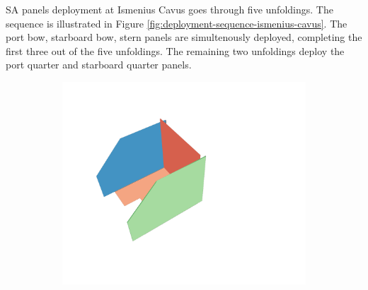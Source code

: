 \vspace{0.5cm}

\ac{SA} panels deployment at Ismenius Cavus goes through five unfoldings. The sequence is illustrated in Figure \ref{fig:deployment-sequence-ismenius-cavus}. The port bow, starboard bow, stern panels are simultenously deployed, completing the first three out of the five unfoldings. The remaining two unfoldings deploy the port quarter and starboard quarter panels.

\vspace{0.5cm}

\begin{figure}[h]
\captionsetup[subfigure]{justification=centering}
\vspace{-2ex}
	\centering
    \setlength{\subfigureWidth}{0.32\textwidth}
    \setlength{\graphicsHeight}{30mm}
    \hypersetup{hidelinks=true}%
	\begin{subfigure}[t]{\subfigureWidth}
        \centering
		\includegraphics[height=\graphicsHeight]{sections/design/solar-array/images/deployment/ismenius-cavus/solar_array_deployment_ismenius_cavus_000.png}
		\label{fig:sub:deployment-sequence-ismenius-cavus-stowed}
	\end{subfigure}\hfill
	\begin{subfigure}[t]{\subfigureWidth}
        \centering

\end{subfigure}
\end{figure}
